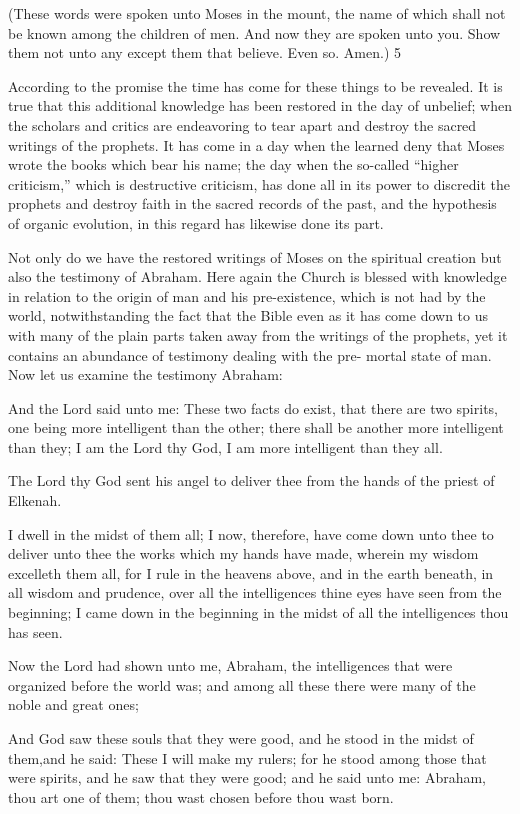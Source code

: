 (These words were spoken unto Moses in the mount, the name of which shall not be known
among the children of men. And now they are spoken unto you. Show them not unto any
except them that believe. Even so. Amen.) 5

According to the promise the time has come for these things to be revealed. It is true that this
additional knowledge has been restored in the day of unbelief; when the scholars and critics
are endeavoring to tear apart and destroy the sacred writings of the prophets. It has come in a
day when the learned deny that Moses wrote the books which bear his name; the day when
the so-called ``higher criticism,'' which is destructive criticism, has done all in its power to
discredit the prophets and destroy faith in the sacred records of the past, and the hypothesis
of organic evolution, in this regard has likewise done its part.

Not only do we have the restored writings of Moses on the spiritual creation but also the
testimony of Abraham. Here again the Church is blessed with knowledge in relation to the
origin of man and his pre-existence, which is not had by the world, notwithstanding the fact
that the Bible even as it has come down to us with many of the plain parts taken away from
the writings of the prophets, yet it contains an abundance of testimony dealing with the pre-
mortal state of man. Now let us examine the testimony Abraham:

And the Lord said unto me: These two facts do exist, that there are two spirits, one being
more intelligent than the other; there shall be another more intelligent than they; I am the
Lord thy God, I am more intelligent than they all.

The Lord thy God sent his angel to deliver thee from the hands of the priest of Elkenah.

I dwell in the midst of them all; I now, therefore, have come down unto thee to deliver unto
thee the works which my hands have made, wherein my wisdom excelleth them all, for I rule
in the heavens above, and in the earth beneath, in all wisdom and prudence, over all the
intelligences thine eyes have seen from the beginning; I came down in the beginning in the
midst of all the intelligences thou has seen.

Now the Lord had shown unto me, Abraham, the intelligences that were organized before the
world was; and among all these there were many of the noble and great ones;

And God saw these souls that they were good, and he stood in the midst of them,and he said:
These I will make my rulers; for he stood among those that were spirits, and he saw that they
were good; and he said unto me: Abraham, thou art one of them; thou wast chosen before
thou wast born.

